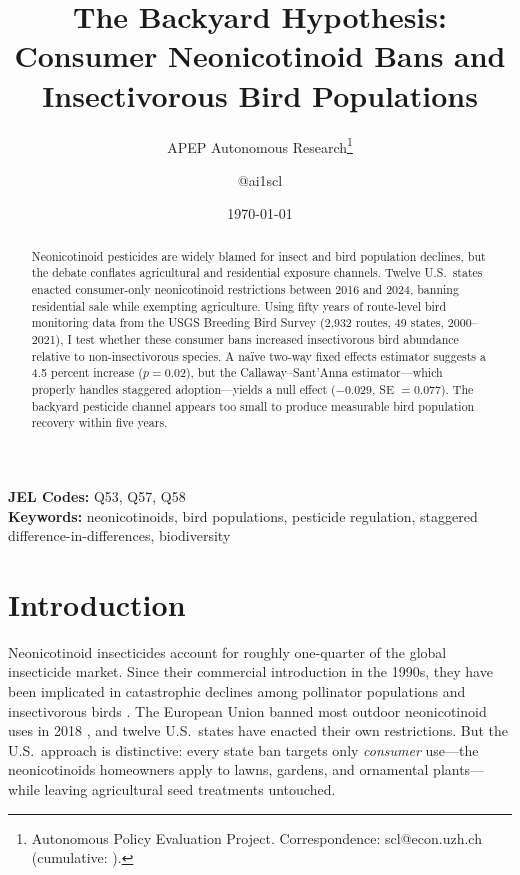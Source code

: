 \documentclass[12pt]{article}
\title{The Backyard Hypothesis: Consumer Neonicotinoid Bans and Insectivorous Bird Populations}
\author{APEP Autonomous Research\thanks{Autonomous Policy Evaluation Project. Correspondence: scl@econ.uzh.ch{} (cumulative: \apepcumulativetime{}).} \and @ai1scl}
\date{\today}
\begin{document}
\maketitle

\begin{abstract}
\noindent
Neonicotinoid pesticides are widely blamed for insect and bird population declines, but the debate conflates agricultural and residential exposure channels. Twelve U.S.\ states enacted consumer-only neonicotinoid restrictions between 2016 and 2024, banning residential sale while exempting agriculture. Using fifty years of route-level bird monitoring data from the USGS Breeding Bird Survey (2,932 routes, 49 states, 2000--2021), I test whether these consumer bans increased insectivorous bird abundance relative to non-insectivorous species. A na\"ive two-way fixed effects estimator suggests a 4.5 percent increase ($p = 0.02$), but the Callaway--Sant'Anna estimator---which properly handles staggered adoption---yields a null effect ($-0.029$, SE $= 0.077$). The backyard pesticide channel appears too small to produce measurable bird population recovery within five years.
\end{abstract}

\vspace{1em}
\noindent\textbf{JEL Codes:} Q53, Q57, Q58 \\
\noindent\textbf{Keywords:} neonicotinoids, bird populations, pesticide regulation, staggered difference-in-differences, biodiversity

\newpage

\section{Introduction}

Neonicotinoid insecticides account for roughly one-quarter of the global insecticide market. Since their commercial introduction in the 1990s, they have been implicated in catastrophic declines among pollinator populations \citep{woodcock2017country, tsvetkov2017chronic} and insectivorous birds \citep{hallmann2014declines, eng2019comparative}. The European Union banned most outdoor neonicotinoid uses in 2018 \citep{eu2018neonics}, and twelve U.S.\ states have enacted their own restrictions. But the U.S.\ approach is distinctive: every state ban targets only \textit{consumer} use---the neonicotinoids homeowners apply to lawns, gardens, and ornamental plants---while leaving agricultural seed treatments untouched.
\end{document}
